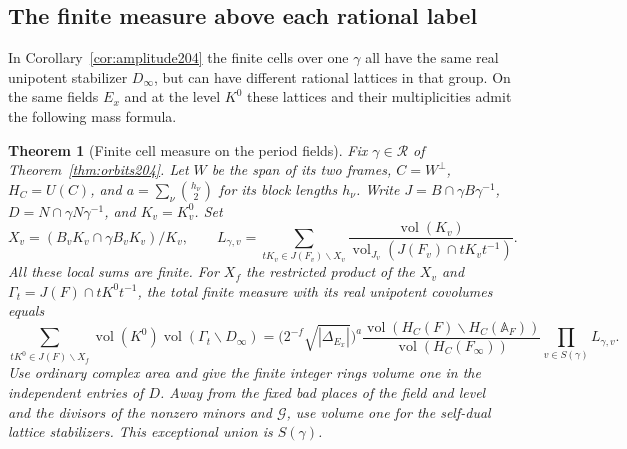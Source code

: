 \documentclass[a4paper,11pt]{article}
\newtheorem{theorem}[proposition]{Theorem}
\theoremstyle{definition}
\theoremstyle{remark}
\numberwithin{equation}{section}
\begin{document}
\subsection{The finite measure above each rational label}\label{nav:IX-19}
In Corollary~\ref{cor:amplitude204} the finite cells over one
\(\gamma\) all have the same real unipotent stabilizer \(D_\infty\),
but can have different rational lattices in that group. On the
same fields \(E_x\) and at the level \(K^0\) these lattices and
their multiplicities admit the following mass formula.

\begin{theorem}[Finite cell measure on the period fields]
\label{thm:mass206}
Fix \(\gamma\in\mathcal R\) of Theorem~\ref{thm:orbits204}. Let
\(W\) be the span of its two frames, \(C=W^\perp\),
\(H_C=U(C)\), and \(a=\sum_\nu\binom{h_\nu}{2}\) for its block
lengths \(h_\nu\). Write \(J=B\cap\gamma B\gamma^{-1}\),
\(D=N\cap\gamma N\gamma^{-1}\), and \(K_v=K_v^0\). Set
\[
 X_v=(B_vK_v\cap\gamma B_vK_v)/K_v,\qquad
 L_{\gamma,v}=
 \sum_{tK_v\in J(F_v)\backslash X_v}
  \frac{\operatorname{vol}(K_v)}
       {\operatorname{vol}_{J_v}(J(F_v)\cap tK_vt^{-1})}.
\]
All these local sums are finite. For \(X_f\) the restricted product
of the \(X_v\) and \(\Gamma_t=J(F)\cap tK^0t^{-1}\), the total
finite measure with its real unipotent covolumes equals
\begin{equation}
 \sum_{tK^0\in J(F)\backslash X_f}
     \operatorname{vol}(K^0)\operatorname{vol}(\Gamma_t\backslash D_\infty)
   =\bigl(2^{-f}\sqrt{|\Delta_{E_x}|}\bigr)^a
       \frac{\operatorname{vol}(H_C(F)\backslash H_C(\mathbb A_F))}
            {\operatorname{vol}(H_C(F_\infty))}
       \prod_{v\in S(\gamma)}L_{\gamma,v}.                \label{eq:mass206}
\end{equation}
Use ordinary complex area and give the finite integer rings volume
one in the independent entries of \(D\). Away from the fixed bad
places of the field and level and the divisors of the nonzero
minors and \(\mathcal G\), use volume one for the self-dual lattice
stabilizers. This exceptional union is \(S(\gamma)\).
\end{theorem}
\end{document}
